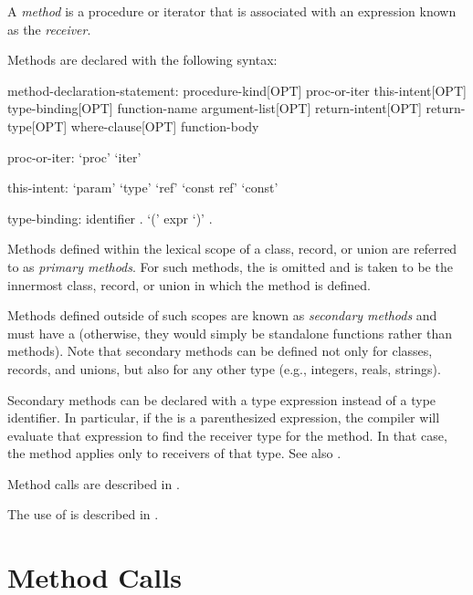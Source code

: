 \label{Methods}

A \emph{method} is a procedure or iterator that is associated with an
expression known as the \emph{receiver}.

Methods are declared with the following syntax:
\begin{syntax}
method-declaration-statement:
  procedure-kind[OPT] proc-or-iter this-intent[OPT] type-binding[OPT] function-name argument-list[OPT]
    return-intent[OPT] return-type[OPT] where-clause[OPT] function-body

proc-or-iter:
  `proc'
  `iter'

this-intent:
  `param'
  `type'
  `ref'
  `const ref'
  `const'

type-binding:
  identifier .
  `(' expr `)' .

\end{syntax}


Methods defined within the lexical scope of a class, record, or union
are referred to as \emph{primary methods}.  For such methods,
the  is omitted and is taken to be the
innermost class, record, or union in which the method is defined.

Methods defined outside of such scopes are known as \emph{secondary
methods} and must have a  (otherwise, they would
simply be standalone functions rather than methods).  Note that
secondary methods can be defined not only for classes, records, and
unions, but also for any other type (e.g., integers, reals, strings).

Secondary methods can be declared with a type expression instead of a
type identifier. In particular, if the  is a
parenthesized expression, the compiler will evaluate that expression to
find the receiver type for the method. In that case, the method applies
only to receivers of that type. See also
.

Method calls are described in .

The use of  is described in .

\section{Method Calls}
\label{Method_Calls}

